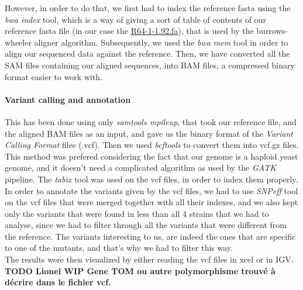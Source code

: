 \documentclass[10pt,a4paper]{article}
\begin{document}
However, in order to do that, we first had to index the reference fasta using the \textit{bwa index} tool\cite{li_fast_2010}, which is a way of giving a sort of table of contents of our reference fasta file (in our case the \href{https://www.ensembl.org/Saccharomyces_cerevisiae/Info/Index}{R64-1-1.92.fa}), that is used by the burrows-wheeler aligner algorithm. Subsequently, we used the \textit{bwa mem} tool in order to align our sequenced data against the reference. Then, we have converted all the SAM\cite{li_sequence_2009} files containing our aligned sequences, into BAM files, a compressed binary format easier to work with.
 
\paragraph{Variant calling and annotation}
This has been done using only \textit{samtools mpileup}, that took our reference file, and the aligned BAM files as an input, and gave us the binary format of the \textit{Variant Calling Format} files (.vcf). Then we used \textit{bcftools} to convert them into vcf.gz files. This method was prefered considering the fact that our genome is a haploid yeast genome, and it doesn’t need a complicated algorithm as used by the \textit{GATK} pipeline. The \textit{tabix}\cite{li_tabix:_2011} tool was used on the vcf files, in order to index them properly.\\

In order to annotate the variants given by the vcf files, we had to use \textit{SNPeff} tool on the vcf files that were merged together with all their indexes, and we also kept only the variants that were found in less than all 4 strains that we had to analyse, since we had to filter through all the variants that were different from the reference. The variants interesting to us, are indeed the ones that are specific to one of the mutants, and that’s why we had to filter this way.\\

The results were then visualized by either reading the vcf files in xcel or in IGV.\\


\textbf{TODO Lionel WIP Gene TOM ou autre polymorphisme trouvé à décrire dans le fichier vcf.}
\end{document}
